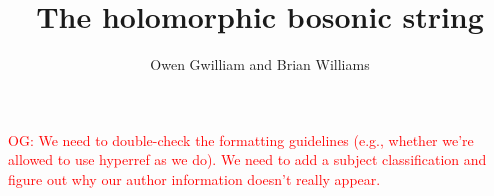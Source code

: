 \documentclass{conm-p-l}
\title{The holomorphic bosonic string}
\author{Owen Gwilliam and Brian Williams}
\def\owen{\textcolor{red}{OG: }\textcolor{red}}
\begin{document}
\maketitle

\setcounter{tocdepth}{1}

\tableofcontents

\owen{We need to double-check the formatting guidelines (e.g., whether we're allowed to use hyperref as we do). We need to add a subject classification and figure out why our author information doesn't really appear.}













\end{document}
